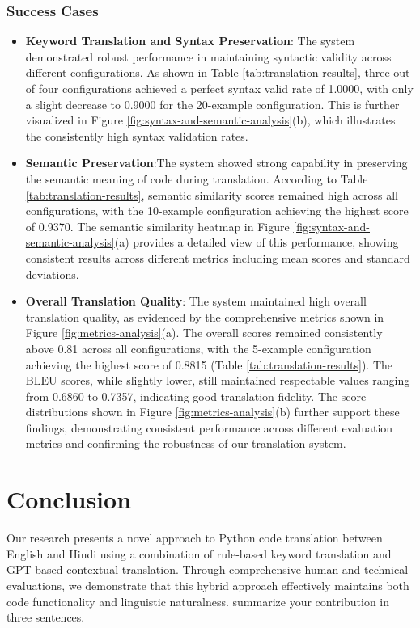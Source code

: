 \documentclass[11pt,a4paper]{article}
\begin{document}
\subsubsection{Success Cases}
\begin{itemize}[itemsep=0pt, topsep=0pt]
    \item \textbf{Keyword Translation and Syntax Preservation}: The system demonstrated robust performance in maintaining syntactic validity across different configurations. As shown in Table \ref{tab:translation-results}, three out of four configurations achieved a perfect syntax valid rate of 1.0000, with only a slight decrease to 0.9000 for the 20-example configuration. This is further visualized in Figure \ref{fig:syntax-and-semantic-analysis}(b), which illustrates the consistently high syntax validation rates.
    \item \textbf{Semantic Preservation}:The system showed strong capability in preserving the semantic meaning of code during translation. According to Table \ref{tab:translation-results}, semantic similarity scores remained high across all configurations, with the 10-example configuration achieving the highest score of 0.9370. The semantic similarity heatmap in Figure \ref{fig:syntax-and-semantic-analysis}(a) provides a detailed view of this performance, showing consistent results across different metrics including mean scores and standard deviations.
    \item \textbf{Overall Translation Quality}: The system maintained high overall translation quality, as evidenced by the comprehensive metrics shown in Figure \ref{fig:metrics-analysis}(a). The overall scores remained consistently above 0.81 across all configurations, with the 5-example configuration achieving the highest score of 0.8815 (Table \ref{tab:translation-results}). The BLEU scores, while slightly lower, still maintained respectable values ranging from 0.6860 to 0.7357, indicating good translation fidelity.
    The score distributions shown in Figure \ref{fig:metrics-analysis}(b) further support these findings, demonstrating consistent performance across different evaluation metrics and confirming the robustness of our translation system.
\end{itemize}

\section{Conclusion}
Our research presents a novel approach to Python code translation between English and Hindi using a combination of rule-based keyword translation and GPT-based contextual translation. Through comprehensive human and technical evaluations, we demonstrate that this hybrid approach effectively maintains both code functionality and linguistic naturalness.
summarize your contribution in three sentences.\\ 
\end{document}
